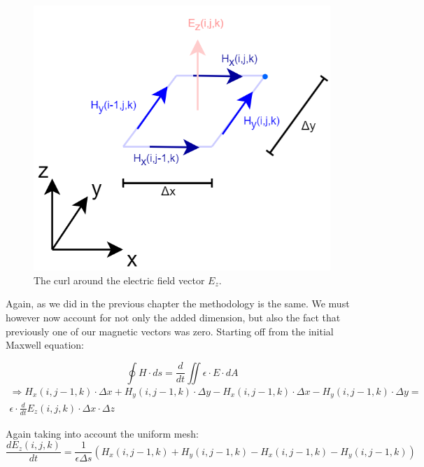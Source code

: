 \begin{figure}[h!]
	\centering
	\includegraphics[scale=0.5]{Figures/fdtd3dEzCurl}
	\decoRule
	\caption[3D $E_z$ vector curl]{The curl around the electric field vector $E_z$.}
	\label{fig:fdtd3dEzCurl}
\end{figure}

Again, as we did in the previous chapter the methodology is the same. We must however now account for not only the added dimension, but also the fact that previously one of our magnetic vectors was zero.
Starting off from the initial Maxwell equation:

\begin{equation}
	\label{eqn:magneticIntegral}
	\oint H \cdot ds = \frac{d}{dt} \iint \epsilon \cdot E \cdot dA
\end{equation}
\begin{multline}
	\label{eqn:3dEzCurl1}
	\Rightarrow H_x(i,j-1,k) \cdot \Delta x + H_y(i,j-1,k) \cdot \Delta y - H_x(i,j-1,k) \cdot \Delta x - H_y(i,j-1,k) \cdot \Delta y =\\ \epsilon \cdot \frac{d}{dt} E_z(i,j,k) \cdot \Delta x \cdot \Delta z
\end{multline}

Again taking into account the uniform mesh:
\begin{equation}
	\label{eqn:3dEzCurl2}
	\frac{d E_z(i,j,k)}{dt} = \frac{1}{\epsilon \Delta s} (H_x(i,j-1,k) + H_y(i,j-1,k) - H_x(i,j-1,k) - H_y(i,j-1,k))
\end{equation}

